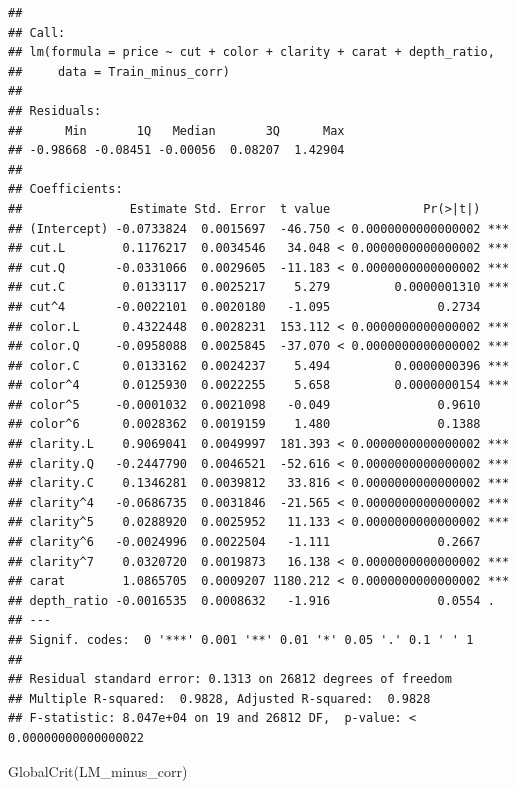 \documentclass[
]{article}
\newenvironment{Shaded}{\begin{snugshade}}{\end{snugshade}}
\newcommand{\FunctionTok}[1]{\textcolor[rgb]{0.00,0.00,0.00}{#1}}
\newcommand{\NormalTok}[1]{#1}
\begin{document}
\begin{verbatim}
## 
## Call:
## lm(formula = price ~ cut + color + clarity + carat + depth_ratio, 
##     data = Train_minus_corr)
## 
## Residuals:
##      Min       1Q   Median       3Q      Max 
## -0.98668 -0.08451 -0.00056  0.08207  1.42904 
## 
## Coefficients:
##               Estimate Std. Error  t value             Pr(>|t|)    
## (Intercept) -0.0733824  0.0015697  -46.750 < 0.0000000000000002 ***
## cut.L        0.1176217  0.0034546   34.048 < 0.0000000000000002 ***
## cut.Q       -0.0331066  0.0029605  -11.183 < 0.0000000000000002 ***
## cut.C        0.0133117  0.0025217    5.279         0.0000001310 ***
## cut^4       -0.0022101  0.0020180   -1.095               0.2734    
## color.L      0.4322448  0.0028231  153.112 < 0.0000000000000002 ***
## color.Q     -0.0958088  0.0025845  -37.070 < 0.0000000000000002 ***
## color.C      0.0133162  0.0024237    5.494         0.0000000396 ***
## color^4      0.0125930  0.0022255    5.658         0.0000000154 ***
## color^5     -0.0001032  0.0021098   -0.049               0.9610    
## color^6      0.0028362  0.0019159    1.480               0.1388    
## clarity.L    0.9069041  0.0049997  181.393 < 0.0000000000000002 ***
## clarity.Q   -0.2447790  0.0046521  -52.616 < 0.0000000000000002 ***
## clarity.C    0.1346281  0.0039812   33.816 < 0.0000000000000002 ***
## clarity^4   -0.0686735  0.0031846  -21.565 < 0.0000000000000002 ***
## clarity^5    0.0288920  0.0025952   11.133 < 0.0000000000000002 ***
## clarity^6   -0.0024996  0.0022504   -1.111               0.2667    
## clarity^7    0.0320720  0.0019873   16.138 < 0.0000000000000002 ***
## carat        1.0865705  0.0009207 1180.212 < 0.0000000000000002 ***
## depth_ratio -0.0016535  0.0008632   -1.916               0.0554 .  
## ---
## Signif. codes:  0 '***' 0.001 '**' 0.01 '*' 0.05 '.' 0.1 ' ' 1
## 
## Residual standard error: 0.1313 on 26812 degrees of freedom
## Multiple R-squared:  0.9828, Adjusted R-squared:  0.9828 
## F-statistic: 8.047e+04 on 19 and 26812 DF,  p-value: < 0.00000000000000022
\end{verbatim}

\begin{Shaded}
\begin{Highlighting}[]
\FunctionTok{GlobalCrit}\NormalTok{(LM\_minus\_corr)}
\end{Highlighting}
\end{Shaded}
\end{document}
